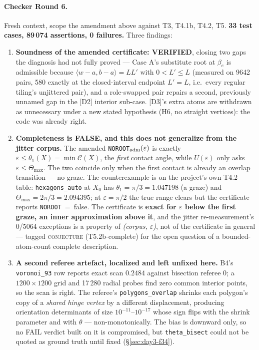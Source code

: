 \documentclass[10pt,a4paper]{article}
\newcommand{\fn}[1]{\nolinkurl{#1}}
\begin{document}
\paragraph{Checker Round 6.} Fresh context, scope the amendment above against T3, T4.1b, T4.2,
T5. \textbf{33 test cases, 89\,074 assertions, 0 failures.} Three findings:

\begin{enumerate}[nosep,leftmargin=5mm]
\item \textbf{Soundness of the amended certificate: VERIFIED}, closing two gaps the diagnosis had
not fully proved --- Case A's substitute root at $\beta_e$ is admissible because
$\langle w-a,b-a\rangle = LL'$ with $0<L'\le L$ (measured on 9642 pairs, 580 exactly at the
closed-interval endpoint $L'=L$, i.e.\ every regular tiling's unjittered pair), and a role-swapped
pair repairs a second, previously unnamed gap in the [D2] interior sub-case. [D3]'s extra atoms
are withdrawn as unnecessary under a new stated hypothesis (H6, no straight vertices): the code
was already right.
\item \textbf{Completeness is FALSE, and this does not generalize from the jitter corpus.} The
amended \texttt{NOROOT}$_{\rm adm}(\varepsilon)$ is exactly $\varepsilon\le\theta_1(X)=\min\mathcal
C(X)$, the \emph{first} contact angle, while $U(\varepsilon)$ only asks $\varepsilon\le\Theta_{\max}$.
The two coincide only when the first contact is already an overlap transition --- no graze. The
counterexample is on the project's own T4.2 table: \fn{hexagons\_auto} at $X_0$ has
$\theta_1=\pi/3=1.047198$ (a graze) and $\Theta_{\max}=2\pi/3=2.094395$; at $\varepsilon=\pi/2$
the true range clears but the certificate reports \texttt{NOROOT}~=~false. The certificate is
\textbf{exact for $\varepsilon$ below the first graze, an inner approximation above it}, and the
jitter re-measurement's 0/5064 exceptions is a property of \emph{(corpus, $\varepsilon$)}, not of
the certificate in general --- tagged \textsc{conjecture} (T5.2b-complete) for the open question
of a bounded-atom-count complete description.
\item \textbf{A second referee artefact, localized and left unfixed here.} B4's \fn{voronoi\_93}
row reports exact scan $0.2484$ against bisection referee $0$; a $1200\times1200$ grid and 17\,280
radial probes find zero common interior points, so the scan is right. The referee's
\fn{polygons\_overlap} shrinks each polygon's copy of a \emph{shared hinge vertex} by a different
displacement, producing orientation determinants of size $10^{-11}$--$10^{-17}$ whose sign flips
with the shrink parameter and with $\theta$ --- non-monotonically. The bias is downward only, so
no FAIL verdict built on it is compromised, but \fn{theta\_bisect} could not be quoted as ground
truth until fixed (\S\ref{sec:day3-f34}).
\end{enumerate}
\end{document}
